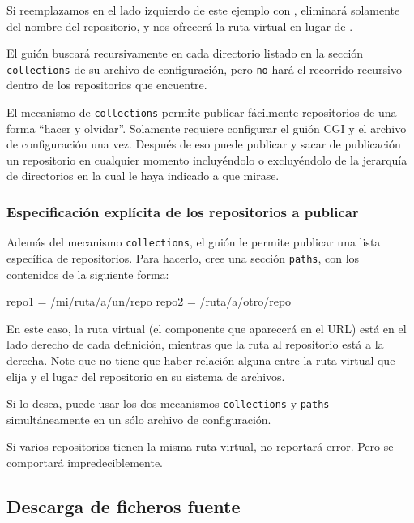 Si reemplazamos  en el lado izquierdo de este
ejemplo con ,  eliminará solamente
 del nombre del repositorio, y nos ofrecerá la ruta
virtual  en lugar de .

El guión  buscará recursivamente en cada
directorio listado en la sección \texttt{collections} de su archivo de
configuración, pero \texttt{no} hará el recorrido recursivo dentro de
los repositorios que encuentre.

El mecanismo de \texttt{collections} permite publicar fácilmente
repositorios de una forma ``hacer y olvidar''.  Solamente requiere
configurar el guión CGI y el archivo de configuración una vez.
Después de eso puede publicar y sacar de publicación un repositorio en
cualquier momento incluyéndolo o excluyéndolo de la jerarquía de
directorios en la cual le haya indicado a  que
mirase.

\subsubsection{Especificación explícita de los repositorios a publicar}

Además del mecanismo \texttt{collections}, el guión
 le permite publicar una lista específica de
repositorios.  Para hacerlo, cree una sección \texttt{paths}, con los
contenidos de la siguiente forma:
\begin{codesample2}
  [paths]
  repo1 = /mi/ruta/a/un/repo
  repo2 = /ruta/a/otro/repo
\end{codesample2}
En este caso, la ruta virtual (el componente que aparecerá en el URL)
está en el lado derecho de cada definición, mientras que la ruta al
repositorio está a la derecha.  Note que no tiene que haber relación
alguna entre la ruta virtual que elija y el lugar del repositorio en
su sistema de archivos.

Si lo desea, puede usar los dos mecanismos \texttt{collections} y
\texttt{paths} simultáneamente en un sólo archivo de configuración.

\begin{note}
  Si varios repositorios tienen la misma ruta virtual,
   no reportará error.  Pero se comportará
  impredeciblemente.
\end{note}

\subsection{Descarga de ficheros fuente}

